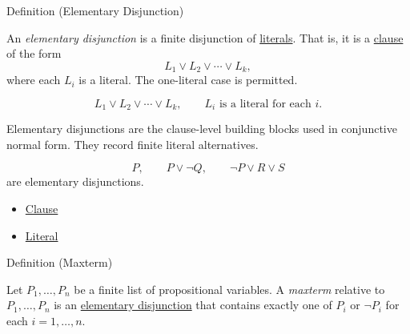\begin{definitionbox}{Definition (Elementary Disjunction)}
\begin{definition}
\label{def:elementary-disjunction-propositional-logic}
An \emph{elementary disjunction} is a finite disjunction of
\hyperref[def:literal-propositional-logic]{literals}. That is, it is a
\hyperref[def:clause-propositional-logic]{clause} of the form
\[
L_1\lor L_2\lor\cdots\lor L_k,
\]
where each \(L_i\) is a literal. The one-literal case is permitted.
\end{definition}
\end{definitionbox}

\begin{remark*}
\[
L_1\lor L_2\lor\cdots\lor L_k,
\qquad
L_i\text{ is a literal for each }i.
\]
\end{remark*}

\begin{remark*}[Interpretation]
Elementary disjunctions are the clause-level building blocks used in
conjunctive normal form. They record finite literal alternatives.
\end{remark*}

\begin{example*}[Examples]
\[
P,\qquad P\lor\neg Q,\qquad \neg P\lor R\lor S
\]
are elementary disjunctions.
\end{example*}

\begin{dependencies}
\begin{itemize}
  \item \hyperref[def:clause-propositional-logic]{Clause}
  \item \hyperref[def:literal-propositional-logic]{Literal}
\end{itemize}
\end{dependencies}

\begin{definitionbox}{Definition (Maxterm)}
\begin{definition}[Maxterm]
\label{def:maxterm-propositional-logic}
Let \(P_1,\ldots,P_n\) be a finite list of propositional variables. A
\emph{maxterm} relative to \(P_1,\ldots,P_n\) is an
\hyperref[def:elementary-disjunction-propositional-logic]{elementary disjunction}
that contains exactly one of \(P_i\) or \(\neg P_i\) for each
\(i=1,\ldots,n\).
\end{definition}
\end{definitionbox}

